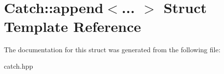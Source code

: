 \hypertarget{structCatch_1_1append}{}\section{Catch\+::append$<$... $>$ Struct Template Reference}
\label{structCatch_1_1append}


The documentation for this struct was generated from the following file\+:\begin{DoxyCompactItemize}
\item 
catch.\+hpp\end{DoxyCompactItemize}
